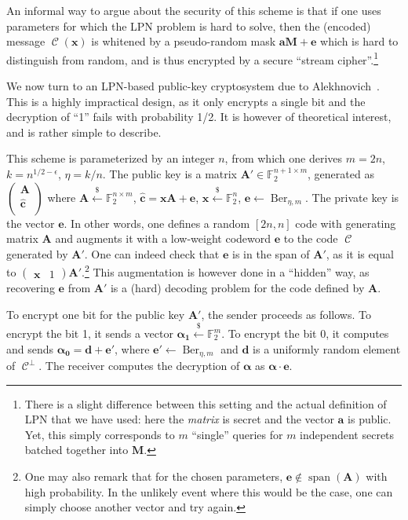 \documentclass[11pt,a4paper]{article}
\theoremstyle{definition}
\DeclareMathOperator\code{\mathcal{C}}
\DeclareMathOperator\Ber{Ber}
\DeclareMathOperator\vspan{span}
\newcommand\ftwo{\mathbb{F}_{2}}
\newcommand\randraw{\xleftarrow{{\scriptscriptstyle\$}}}
\begin{document}
An informal way to argue about the security of this scheme is that if one uses parameters for which the LPN problem is hard to solve, then the (encoded) message $\code(\bm{x})$ is whitened
by a pseudo-random mask $\bm{a}\bm{M} + \bm{e}$ which is hard to distinguish from random, and is thus encrypted by a secure ``stream cipher''.\footnote{There is a slight difference between this
setting and the actual definition of LPN that we have used: here the \emph{matrix} is secret and the vector $\bm{a}$ is public. Yet, this simply corresponds to $m$ ``single'' queries for $m$
independent secrets batched together into $\bm{M}$.}

\medskip

We now turn to an LPN-based public-key cryptosystem due to Alekhnovich~\cite{alekh03}. This is a highly impractical design, as it only encrypts a single bit and the decryption of ``1'' fails with
probability 1/2. It is however of theoretical interest, and is rather simple to describe.

This scheme is parameterized by an integer $n$, from which one derives $m = 2n$, $k = n^{1/2-\epsilon}$, $\eta = k/n$. The public key is a matrix $\bm{A}' \in \ftwo^{n+1\times m}$, generated
as $\begin{pmatrix}\bm{A}\\ \bm{\hat{c}}\\ \end{pmatrix}$ where $\bm{A} \randraw \ftwo^{n\times m}$,  $\bm{\hat{c}} = \bm{x}\bm{A} + \bm{e}$,   $\bm{x} \randraw \ftwo^n$, $\bm{e} \leftarrow \Ber_{\eta,m}$.
The private key is the vector $\bm{e}$.
In other words, one defines a random $[2n,n]$ code with generating matrix $\bm{A}$ and augments it with a low-weight codeword $\bm{e}$ to the code $\code$ generated by $\bm{A}'$. One can indeed check
that $\bm{e}$ is in the span of $\bm{A}'$, as it is equal to $\begin{pmatrix} \bm{x} & 1 \end{pmatrix}\bm{A}'$.\footnote{One may also remark that for the chosen parameters, $\bm{e} \notin \vspan(\bm{A})$
with high probability. In the unlikely event where this would be the case, one can simply choose another vector and try again.}
This augmentation is however done in a ``hidden'' way, as recovering $\bm{e}$
from $\bm{A}'$ is a (hard) decoding problem for the code defined by $\bm{A}$.

To encrypt one bit for the public key $\bm{A}'$, the sender proceeds as follows. To encrypt the bit 1, it sends a vector $\bm{\alpha_1} \randraw \ftwo^m$. To encrypt the bit 0,
it computes and sends $\bm{\alpha_0} = \bm{d} + \bm{e}'$, where $\bm{e}' \leftarrow \Ber_{\eta,m}$ and $\bm{d}$ is a uniformly random element of $\code^\bot$.
The receiver computes the decryption of $\bm{\alpha}$ as $\bm{\alpha} \cdot \bm{e}$.
\end{document}
